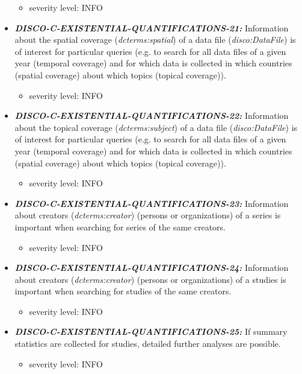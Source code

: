 \documentclass{llncs}
\begin{document}
\begin{itemize}
	\begin{itemize}
		\item severity level: INFO
	\end{itemize}
	\item \textbf{{\em DISCO-C-EXISTENTIAL-QUANTIFICATIONS-21:}} 
  Information about the spatial coverage (\emph{dcterms:spatial}) of a data file (\emph{disco:DataFile}) is of interest for particular queries 
	(e.g. to search for all data files of a given year (temporal coverage) and for which data is collected in which countries (spatial coverage) about which topics (topical coverage)).
	\begin{itemize}
		\item severity level: INFO
	\end{itemize}
	\item \textbf{{\em DISCO-C-EXISTENTIAL-QUANTIFICATIONS-22:}} 
  Information about the topical coverage (\emph{dcterms:subject}) of a data file (\emph{disco:DataFile}) is of interest for particular queries 
	(e.g. to search for all data files of a given year (temporal coverage) and for which data is collected in which countries (spatial coverage) about which topics (topical coverage)).
	\begin{itemize}
		\item severity level: INFO
	\end{itemize}
	\item \textbf{{\em DISCO-C-EXISTENTIAL-QUANTIFICATIONS-23:}} 
  Information about creators (\emph{dcterms:creator}) (persons or organizations) of a series is important when searching for series of the same creators.
	\begin{itemize}
		\item severity level: INFO
	\end{itemize}
	\item \textbf{{\em DISCO-C-EXISTENTIAL-QUANTIFICATIONS-24:}} 
  Information about creators (\emph{dcterms:creator}) (persons or organizations) of a studies is important when searching for studies of the same creators.
	\begin{itemize}
		\item severity level: INFO
	\end{itemize}
	\item \textbf{{\em DISCO-C-EXISTENTIAL-QUANTIFICATIONS-25:}} 
  If summary statistics are collected for studies, detailed further analyses are possible. 
	\begin{itemize}
		\item severity level: INFO

\end{itemize}
\end{itemize}
\end{document}
